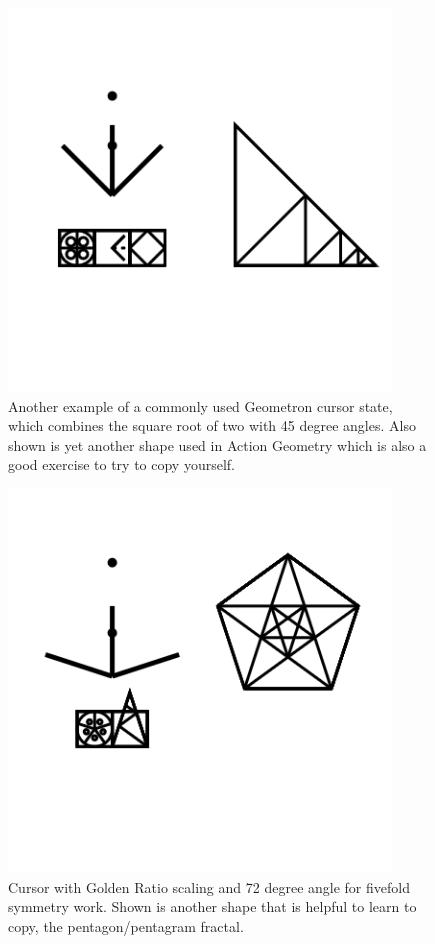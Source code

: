 \begin{figure}
	\centering
	\includegraphics[width=4in]{figures/web2d/cursorroot2.png}
	\caption[cursorroot2]
	{Another example of a commonly used Geometron cursor state, which combines the square root of two with 45 degree angles.  Also shown is yet another shape used in Action Geometry which is also a good exercise to try to copy yourself.}
\end{figure}
\begin{figure}
	\centering
	\includegraphics[width=4in]{figures/web2d/cursorgolden.png}
	\caption[cursorgolden]
	{Cursor with Golden Ratio scaling and 72 degree angle for fivefold symmetry work.  Shown is another shape that is helpful to learn to copy, the pentagon/pentagram fractal.}
\end{figure}
